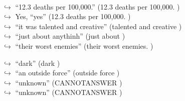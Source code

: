 \documentclass[11pt,a4paper, onecolumn]{article}
\begin{document}
\begin{figure}[t]
\begin{tcolorbox}[boxsep=0pt,left=5pt,right=0pt,top=2pt,colback = yellow!5]
\begin{dialogue}
\\
\colorbox{pink!25}{$\hookrightarrow$}
{ ``12.3 deaths per 100,000.'' (12.3 deaths per 100,000. ) }
\\
\colorbox{pink!25}{$\hookrightarrow$}
\colorbox{red!25}{Yes,}
{ ``yes'' (12.3 deaths per 100,000. ) }
\\
\colorbox{pink!25}{$\hookrightarrow$}
{ ``it was talented and creative'' (talented and creative ) }
\\
\colorbox{pink!25}{$\hookrightarrow$}
{ ``just about anythinh'' (just about ) }
\\
\colorbox{pink!25}{$\hookrightarrow$}
{ ``their worst enemies'' (their worst enemies. ) }
 \end{dialogue}\end{tcolorbox}\end{figure}\begin{figure}[t] \small \begin{tcolorbox}[boxsep=0pt,left=5pt,right=0pt,top=2pt,colback = yellow!5] \begin{dialogue}
 \small 
\colorbox{pink!25}{$\hookrightarrow$}
{ ``dark'' (dark ) }
\\
\colorbox{pink!25}{$\hookrightarrow$}
{ ``an outside force'' (outside force ) }
\\
\colorbox{pink!25}{$\hookrightarrow$}
{ ``unknown'' (CANNOTANSWER ) }
\\
\colorbox{pink!25}{$\hookrightarrow$}
{ ``unknown'' (CANNOTANSWER ) }
\\
 \end{dialogue}\end{tcolorbox}\end{figure}
\end{document}
